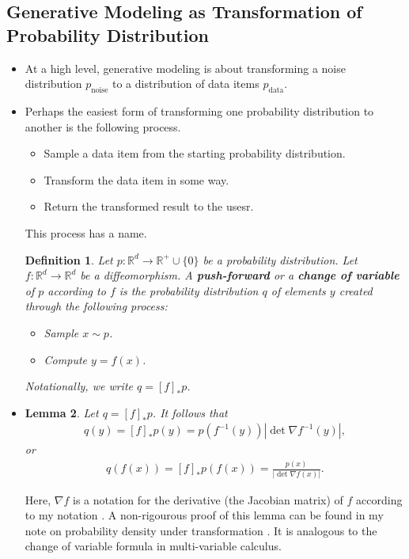 \documentclass[10pt]{article}
\newtheorem{lemma}{Lemma}
\newtheorem{definition}[lemma]{Definition}
\newcommand{\mrm}[1]{\mathrm{#1}}
\newcommand{\Real}{\mathbb{R}}
\newcommand{\data}{\mathrm{data}}
\begin{document}
\subsection{Generative Modeling as Transformation of Probability Distribution}

\begin{itemize}
  \item At a high level, generative modeling is about transforming a noise distribution $p_{\mrm{noise}}$ to a distribution of data items $p_{\data}$.
  
  \item Perhaps the easiest form of transforming one probability distribution to another is the following process.
  \begin{itemize}
    \item Sample a data item from the starting probability distribution.
    \item Transform the data item in some way.
    \item Return the transformed result to the usesr.
  \end{itemize}
  This process has a name.
  \begin{definition}
    Let $p: \Real^d \rightarrow \Real^{+}\cup \{0\}$ be a probability distribution. Let $f: \Real^d \rightarrow \Real^d$ be a diffeomorphism. A {\bf push-forward} or a {\bf change of variable} of $p$ according to $f$ is the probability distribution $q$ of elements $y$ created through the following process:
    \begin{itemize}
      \item Sample $x \sim p$.
      \item Compute $y = f(x)$.
    \end{itemize}
    Notationally, we write $q = [f]_* p$.
  \end{definition}

  \item \begin{lemma}
    Let $q = [f]_*p$. It follows that
    \begin{align*}
      q(y) = [f]_*p(y) = p(f^{-1}(y)) | \det \nabla f^{-1}(y) |,
    \end{align*}
    or
    \begin{align*}
      q(f(x)) = [f]_*p(f(x)) = \frac{p(x)}{|\det \nabla f(x)|}.
    \end{align*}    
  \end{lemma}
  Here, $\nabla f$ is a notation for the derivative (the Jacobian matrix) of $f$ according to my notation \cite{Khungurn:Notation}. A non-rigourous proof of this lemma can be found in my note on probability density under transformation \cite{Khungurn:ProbXform}. It is analogous to the change of variable formula in multi-variable calculus.


\end{itemize}
\end{document}

